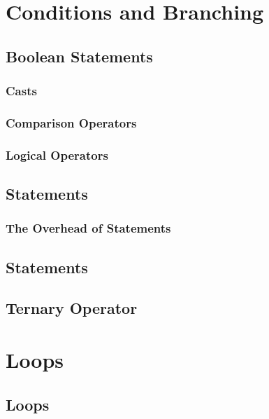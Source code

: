 \documentclass{article}
\begin{document}
\section{Conditions and Branching}

\subsection{Boolean Statements}

\subsubsection{ Casts}

\subsubsection{Comparison Operators}

\subsubsection{Logical Operators}

\subsection{ Statements}

\subsubsection{The Overhead of  Statements}

\subsection{ Statements}

\subsection{Ternary Operator }

\section{Loops}

\subsection{ Loops}
\end{document}
